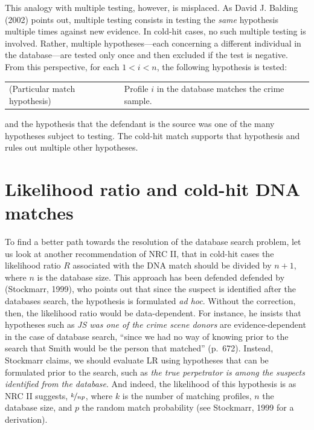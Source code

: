 \documentclass[
  10pt,
  dvipsnames,enabledeprecatedfontcommands]{scrartcl}
\begin{document}
This analogy with multiple testing, however, is misplaced. As David J.
Balding (2002) points out, multiple testing consists in testing the
\textit{same} hypothesis multiple times against new evidence. In
cold-hit cases, no such multiple testing is involved. Rather, multiple
hypotheses---each concerning a different individual in the
database---are tested only once and then excluded if the test is
negative. From this perspective, for each \(1 < i <n\), the following
hypothesis is tested: \vspace{1mm}

\begin{tabular}{lp{8cm}}
(Particular match hypothesis) &
Profile $i$ in the database matches the crime sample.
\end{tabular}
\vspace{1mm}

\noindent and the hypothesis that the defendant is the source was one of
the many hypotheses subject to testing. The cold-hit match supports that
hypothesis and rules out multiple other hypotheses.

\section{ Likelihood ratio and cold-hit DNA matches \label{sec:cold-hit}}

To find a better path towards the resolution of the database search
problem, let us look at another recommendation of NRC II, that in
cold-hit cases the likelihood ratio \(R\) associated with the DNA match
should be divided by \(n+1\), where \(n\) is the database size. This
approach has been defended defended by (Stockmarr, 1999), who points out
that since the suspect is identified after the databases search, the
hypothesis is formulated \textit{ad hoc}. Without the correction, then,
the likelihood ratio would be data-dependent. For instance, he insists
that hypotheses such as \emph{JS was one of the crime scene donors} are
evidence-dependent in the case of database search, ``since we had no way
of knowing prior to the search that Smith would be the person that
matched'' (p.~672). Instead, Stockmarr claims, we should evaluate LR
using hypotheses that can be formulated prior to the search, such as
\emph{the true perpetrator is among the suspects identified from the database}.
And indeed, the likelihood of this hypothesis is as NRC II suggests,
\(\nicefrac{k}{np}\), where \(k\) is the number of matching profiles,
\(n\) the database size, and \(p\) the random match probability (see
Stockmarr, 1999 for a derivation).
\end{document}
